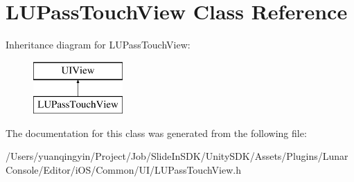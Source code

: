 \hypertarget{interface_l_u_pass_touch_view}{}\section{L\+U\+Pass\+Touch\+View Class Reference}
\label{interface_l_u_pass_touch_view}
Inheritance diagram for L\+U\+Pass\+Touch\+View\+:\begin{figure}[H]
\begin{center}
\leavevmode
\includegraphics[height=2.000000cm]{interface_l_u_pass_touch_view}
\end{center}
\end{figure}


The documentation for this class was generated from the following file\+:\begin{DoxyCompactItemize}
\item 
/\+Users/yuanqingyin/\+Project/\+Job/\+Slide\+In\+S\+D\+K/\+Unity\+S\+D\+K/\+Assets/\+Plugins/\+Lunar\+Console/\+Editor/i\+O\+S/\+Common/\+U\+I/L\+U\+Pass\+Touch\+View.\+h\end{DoxyCompactItemize}
